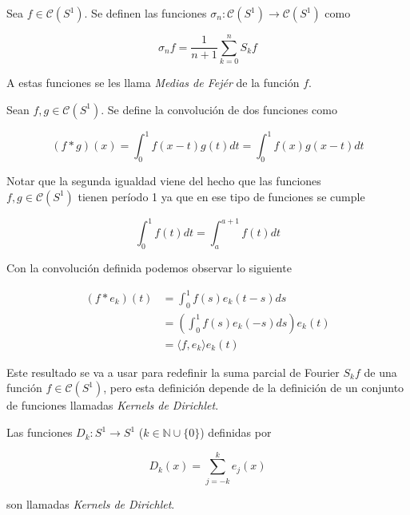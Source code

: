 \begin{definicion}
	Sea $f \in \mathcal{C}(S^1)$. Se definen las funciones $\sigma_n: \mathcal{C}(S^1) \rightarrow \mathcal{C}(S^1)$ como
	
	\begin{equation}
		\sigma_n f = \frac{1}{n+1} \sum_{k=0}^{n} S_k f
	\end{equation}
	
	A estas funciones se les llama \textit{Medias de Fejér} de la función $f$.
\end{definicion}

\begin{definicion}
	Sean $f,g \in \mathcal{C}(S^1)$. Se define la convolución de dos funciones como
	
	\begin{equation}
		(f*g)(x) = \int_{0}^{1} f(x-t)g(t)dt = \int_{0}^{1} f(x)g(x-t)dt
	\end{equation}
\end{definicion}

Notar que la segunda igualdad viene del hecho que las funciones\\
 $f,g \in \mathcal{C}(S^1)$ tienen período 1 ya que en ese tipo de funciones se cumple

\begin{equation}
	\int_{0}^{1} f(t)dt = \int_{a}^{a+1} f(t)dt
\end{equation}

Con la convolución definida podemos observar lo siguiente

\begin{align}
	(f*e_k)(t) &= \int_{0}^{1} f(s)e_k(t-s)ds\\
	&= \left( \int_{0}^{1} f(s) e_k(-s)ds \right) e_k(t)\\
	&= \langle f,e_k \rangle e_k(t)
\end{align}

Este resultado se va a usar para redefinir la suma parcial de Fourier $S_k f$ de una función $f \in \mathcal{C}(S^1)$, pero esta definición depende de la definición de un conjunto de funciones llamadas \textit{Kernels de Dirichlet}.

\begin{definicion}
	Las funciones $D_k: S^1 \rightarrow S^1$ ($k \in \mathbb{N} \cup \{0\}$) definidas por
	
	\begin{equation}
		D_k(x) = \sum_{j=-k}^{k} e_j(x)
	\end{equation}
	
	son llamadas \textit{Kernels de Dirichlet}. 
\end{definicion}

